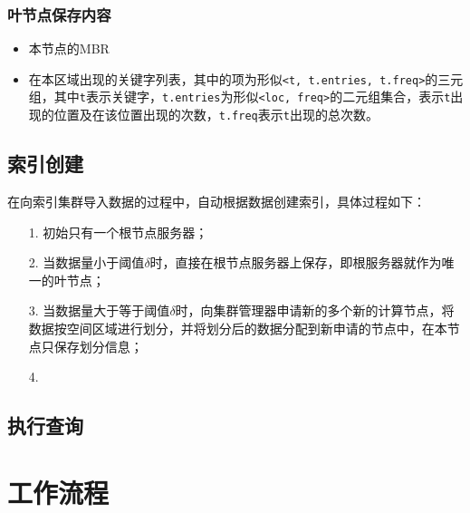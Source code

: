 \documentclass{elegantpaper}
\begin{document}
\subsubsection{叶节点保存内容}

\begin{itemize}

    \item 本节点的MBR
    
    \item 在本区域出现的关键字列表，其中的项为形似\verb|<t, t.entries, t.freq>|的三元组，其中\verb|t|表示关键字，\verb|t.entries|为形似\verb|<loc, freq>|的二元组集合，表示\verb|t|出现的位置及在该位置出现的次数，\verb|t.freq|表示\verb|t|出现的总次数。

\end{itemize}

\subsection{索引创建}

在向索引集群导入数据的过程中，自动根据数据创建索引，具体过程如下：

\begin{itemize}
    
    \item[1.] 初始只有一个根节点服务器；
    
    \item[2.] 当数据量小于阈值$\delta$时，直接在根节点服务器上保存，即根服务器就作为唯一的叶节点；
    
    \item[3.] 当数据量大于等于阈值$\delta$时，向集群管理器申请新的多个新的计算节点，将数据按空间区域进行划分，并将划分后的数据分配到新申请的节点中，在本节点只保存划分信息；
    
    \item[4.] 

\end{itemize}

\subsection{执行查询}



\section{工作流程}
\end{document}

